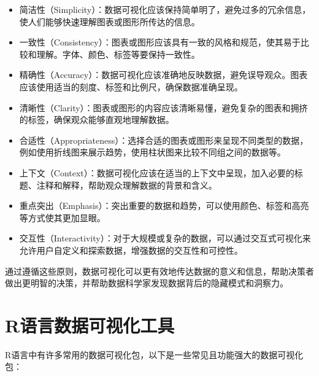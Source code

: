 \documentclass[]{book}
\begin{document}
\begin{itemize}
\item
  简洁性（Simplicity）：数据可视化应该保持简单明了，避免过多的冗余信息，使人们能够快速理解图表或图形所传达的信息。
\item
  一致性（Consistency）：图表或图形应该具有一致的风格和规范，使其易于比较和理解。字体、颜色、标签等要保持一致性。
\item
  精确性（Accuracy）：数据可视化应该准确地反映数据，避免误导观众。图表应该使用适当的刻度、标签和比例尺，确保数据准确呈现。
\item
  清晰性（Clarity）：图表或图形的内容应该清晰易懂，避免复杂的图表和拥挤的标签，确保观众能够直观地理解数据。
\item
  合适性（Appropriateness）：选择合适的图表或图形来呈现不同类型的数据，例如使用折线图来展示趋势，使用柱状图来比较不同组之间的数据等。
\item
  上下文（Context）：数据可视化应该在适当的上下文中呈现，加入必要的标题、注释和解释，帮助观众理解数据的背景和含义。
\item
  重点突出（Emphasis）：突出重要的数据和趋势，可以使用颜色、标签和高亮等方式使其更加显眼。
\item
  交互性（Interactivity）：对于大规模或复杂的数据，可以通过交互式可视化来允许用户自定义和探索数据，增强数据的交互性和可控性。
\end{itemize}

通过遵循这些原则，数据可视化可以更有效地传达数据的意义和信息，帮助决策者做出更明智的决策，并帮助数据科学家发现数据背后的隐藏模式和洞察力。

\hypertarget{rux8bedux8a00ux6570ux636eux53efux89c6ux5316ux5de5ux5177}{%
\section{R语言数据可视化工具}\label{rux8bedux8a00ux6570ux636eux53efux89c6ux5316ux5de5ux5177}}

R语言中有许多常用的数据可视化包，以下是一些常见且功能强大的数据可视化包：
\end{document}
